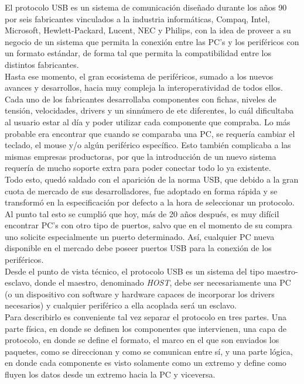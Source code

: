 El protocolo USB es un sistema de comunicación diseñado durante los años 90 por seis fabricantes vinculados a la industria informáticas, Compaq, Intel, Microsoft, Hewlett-Packard, Lucent, NEC y Philips, con la idea de proveer a su negocio de un sistema que permita la conexión entre las PC's y los periféricos con un formato estándar, de forma tal que permita la compatibilidad entre los distintos fabricantes.\\

Hasta ese momento, el gran ecosistema de periféricos, sumado a los nuevos avances y desarrollos, hacia muy compleja la interoperatividad de todos ellos. Cada uno de los fabricantes desarrollaba componentes con fichas, niveles de tensión, velocidades, drivers y un sinnúmero de etc diferentes, lo cuál dificultaba al usuario estar al día y poder utilizar cada componente que compraba. Lo más probable era encontrar que cuando se comparaba una PC, se requería cambiar el teclado, el mouse y/o algún periférico específico. Esto también complicaba a las mismas empresas productoras, por que la introducción de un nuevo sistema requería de mucho soporte extra para poder conectar todo lo ya existente.\\

Todo esto, quedó saldado con el aparición de la norma USB, que debido a la gran cuota de mercado de sus desarrolladores, fue adoptado en forma rápida y se transformó en la especificación por defecto a la hora de seleccionar un protocolo. Al punto tal esto se cumplió que hoy, más de 20 años después, es muy difícil encontrar PC's con otro tipo de puertos, salvo que en el momento de su compra uno solicite especialmente un puerto determinado. Así, cualquier PC nueva disponible en el mercado debe poseer puertos USB para la conexión de los periféricos.\\

Desde el punto de vista técnico, el protocolo USB es un sistema del tipo maestro-esclavo, donde el maestro, denominado {\it HOST}, debe ser necesariamente una PC (o un dispositivo con software y hardware capaces de incorporar los drivers necesarios) y cualquier periférico a ella acoplada será un esclavo\cite{USBspec}.\\

Para describirlo es conveniente tal vez separar el protocolo en tres partes. Una parte física, en donde se definen los componentes que intervienen, una capa de protocolo, en donde se define el formato, el marco en el que son enviados los paquetes, como se direccionan y como se comunican entre sí, y una parte lógica, en donde cada componente es visto solamente como un extremo y define como fluyen los datos desde un extremo hacia la PC y viceversa.\\

